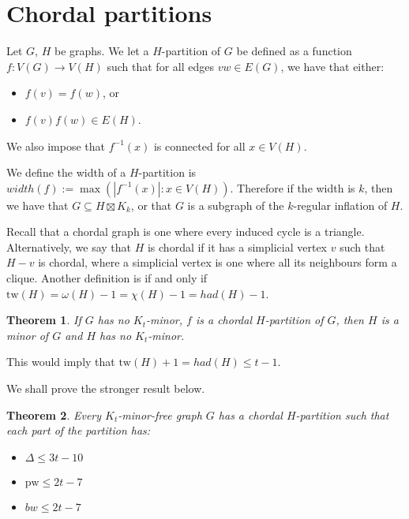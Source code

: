 \documentclass[]{article}
\newcommand{\tw}{\text{tw}}
\newcommand{\pw}{\text{pw}}
\newtheorem{theorem}{Theorem}
\theoremstyle{definition}
\numberwithin{theorem}{section}
\numberwithin{equation}{section}
\begin{document}
\section{Chordal partitions}
Let $G$, $H$ be graphs. We let a $H$-partition of $G$ be defined as a function $f: V(G) \rightarrow V(H)$ such that for all edges $vw \in E(G)$, we have that either:
\begin{itemize}
	\item $f(v) = f(w)$, or
	\item $f(v) f(w) \in E(H)$.
\end{itemize}
We also impose that $f^{-1}(x)$ is connected for all $x \in V(H)$. 

We define the width of a $H$-partition is $width(f) := \max( |f^{-1} (x)| : x \in V(H))$. Therefore if the width is $k$, then we have that $G \subseteq H \boxtimes K_k$, or that $G$ is a subgraph of the $k$-regular inflation of $H$. 

Recall that a chordal graph is one where every induced cycle is a triangle. Alternatively, we say that $H$ is chordal if it has a simplicial vertex $v$ such that $H - v$ is chordal, where a simplicial vertex is one where all its neighbours form a clique. Another definition is if and only if $\tw(H) = \omega(H) - 1 = \chi(H) - 1 = had(H) - 1$. 


\begin{theorem}
	If $G$ has no $K_t$-minor, $f$ is a chordal $H$-partition of $G$, then $H$ is a minor of $G$ and $H$ has no $K_t$-minor.
\end{theorem}

This would imply that $\tw(H) + 1 = had(H) \leq t - 1$. 

We shall prove the stronger result below. 
\begin{theorem}
	Every $K_t$-minor-free graph $G$ has a chordal $H$-partition such that each part of the partition has:
	\begin{itemize}
		\item $\Delta \leq 3t - 10$
		\item $\pw \leq 2t - 7$
		\item $bw \leq 2t - 7$
	\end{itemize}
\end{theorem}
\end{document}
